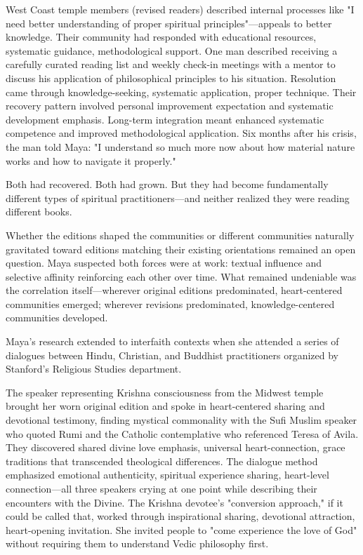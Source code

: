 \documentclass[12pt,twoside]{book}
\begin{document}
West Coast temple members (revised readers) described internal processes like "I need better understanding of proper spiritual principles"—appeals to better knowledge. Their community had responded with educational resources, systematic guidance, methodological support. One man described receiving a carefully curated reading list and weekly check-in meetings with a mentor to discuss his application of philosophical principles to his situation. Resolution came through knowledge-seeking, systematic application, proper technique. Their recovery pattern involved personal improvement expectation and systematic development emphasis. Long-term integration meant enhanced systematic competence and improved methodological application. Six months after his crisis, the man told Maya: "I understand so much more now about how material nature works and how to navigate it properly."

Both had recovered. Both had grown. But they had become fundamentally different types of spiritual practitioners—and neither realized they were reading different books.

Whether the editions shaped the communities or different communities naturally gravitated toward editions matching their existing orientations remained an open question. Maya suspected both forces were at work: textual influence and selective affinity reinforcing each other over time. What remained undeniable was the correlation itself—wherever original editions predominated, heart-centered communities emerged; wherever revisions predominated, knowledge-centered communities developed.

Maya's research extended to interfaith contexts when she attended a series of dialogues between Hindu, Christian, and Buddhist practitioners organized by Stanford's Religious Studies department.

The speaker representing Krishna consciousness from the Midwest temple brought her worn original edition and spoke in heart-centered sharing and devotional testimony, finding mystical commonality with the Sufi Muslim speaker who quoted Rumi and the Catholic contemplative who referenced Teresa of Avila. They discovered shared divine love emphasis, universal heart-connection, grace traditions that transcended theological differences. The dialogue method emphasized emotional authenticity, spiritual experience sharing, heart-level connection—all three speakers crying at one point while describing their encounters with the Divine. The Krishna devotee's "conversion approach," if it could be called that, worked through inspirational sharing, devotional attraction, heart-opening invitation. She invited people to "come experience the love of God" without requiring them to understand Vedic philosophy first.
\end{document}
